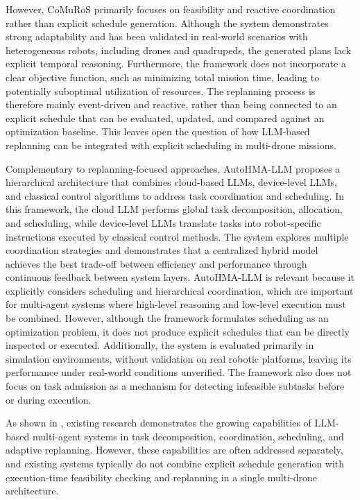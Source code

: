 However, CoMuRoS primarily focuses on feasibility and reactive coordination rather than explicit schedule generation.
Although the system demonstrates strong adaptability and has been validated in real-world scenarios with heterogeneous robots, including drones and quadrupeds, 
the generated plans lack explicit temporal reasoning.
Furthermore, the framework does not incorporate a clear objective function, such as minimizing total mission time, 
leading to potentially suboptimal utilization of resources.
The replanning process is therefore mainly event-driven and reactive, rather than being connected to an explicit schedule that can be evaluated, updated, and compared against an optimization baseline.
This leaves open the question of how LLM-based replanning can be integrated with explicit scheduling in multi-drone missions.

Complementary to replanning-focused approaches, 
AutoHMA-LLM \cite{yang2025autohma} proposes a hierarchical architecture that combines cloud-based LLMs, device-level LLMs, 
and classical control algorithms to address task coordination and scheduling. 
In this framework, the cloud LLM performs global task decomposition, allocation, and scheduling,
while device-level LLMs translate tasks into robot-specific instructions executed by classical control methods. 
The system explores multiple coordination strategies and demonstrates that a centralized hybrid model achieves the best trade-off between
efficiency and performance through continuous feedback between system layers. 
AutoHMA-LLM is relevant because it explicitly considers scheduling and hierarchical coordination, 
which are important for multi-agent systems where high-level reasoning and low-level execution must be combined.
However, although the framework formulates scheduling as an optimization problem, 
it does not produce explicit schedules that can be directly inspected or executed. 
Additionally, the system is evaluated primarily in simulation environments, without validation on real robotic platforms, 
leaving its performance under real-world conditions unverified.
The framework also does not focus on task admission as a mechanism for detecting infeasible subtasks before or during execution.



As shown in , existing research demonstrates the growing
capabilities of LLM-based multi-agent systems in task decomposition, coordination,
scheduling, and adaptive replanning. However, these capabilities are often addressed
separately, and existing systems typically do not combine explicit schedule generation with
execution-time feasibility checking and replanning in a single multi-drone architecture.

